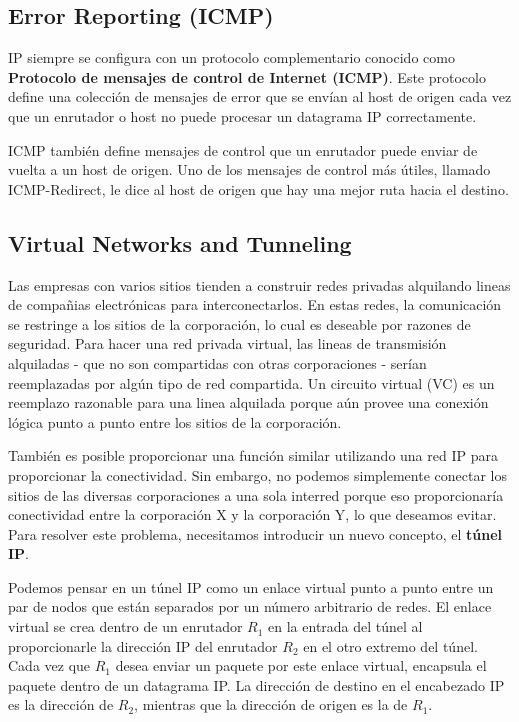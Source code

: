 \subsection{Error Reporting (ICMP)}
IP siempre se configura con un protocolo complementario conocido como \textbf{Protocolo de mensajes de control de Internet (ICMP)}. Este protocolo define una colección de mensajes de error que se envían al host de origen cada vez que un enrutador o host no puede procesar un datagrama IP correctamente.

ICMP también define mensajes de control que un enrutador puede enviar de vuelta a un host de origen. Uno de los mensajes de control más útiles, llamado ICMP-Redirect, le dice al host de origen que hay una mejor ruta hacia el destino.

\subsection{Virtual Networks and Tunneling}

Las empresas con varios sitios tienden a construir redes privadas alquilando lineas de compañias electrónicas para interconectarlos. En estas redes, la comunicación se restringe a los sitios de la corporación, lo cual es deseable por razones de seguridad. Para hacer una red privada virtual, las lineas de transmisión alquiladas - que no son compartidas con otras corporaciones - serían reemplazadas por algún tipo de red compartida. Un circuito virtual (VC) es un reemplazo razonable para una linea alquilada porque aún provee una conexión lógica punto a punto entre los sitios de la corporación.

También es posible proporcionar una función similar utilizando una red IP para proporcionar la conectividad. Sin embargo, no podemos simplemente conectar los sitios de las diversas corporaciones a una sola interred porque eso proporcionaría conectividad entre la corporación X y la corporación Y, lo que deseamos evitar. Para resolver este problema, necesitamos introducir un nuevo concepto, el \textbf{túnel IP}.

Podemos pensar en un túnel IP como un enlace virtual punto a punto entre un par de nodos que están separados por un número arbitrario de redes. El enlace virtual se crea dentro de un enrutador \(R_1\) en la entrada del túnel al proporcionarle la dirección IP del enrutador \(R_2\) en el otro extremo del túnel. Cada vez que \(R_1\) desea enviar un paquete por este enlace virtual, encapsula el paquete dentro de un datagrama IP. La dirección de destino en el encabezado IP es la dirección de \(R_2\), mientras que la dirección de origen es la de \(R_1\).

